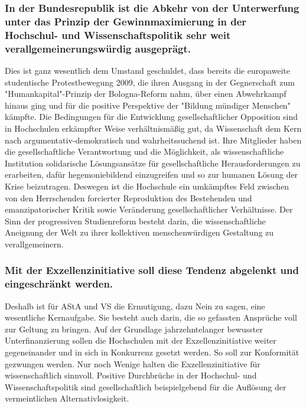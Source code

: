 \documentclass[ngerman,headheight=70pt]{scrartcl}
\begin{document}
    \subsubsection{In der Bundesrepublik ist die Abkehr von der Unterwerfung
    unter das Prinzip der Gewinnmaximierung in der Hochschul- und
    Wissenschaftspolitik sehr weit verallgemeinerungswürdig ausgeprägt.}

    Dies ist ganz wesentlich dem Umstand geschuldet, dass bereits die europaweite
    studentische Protestbewegung 2009, die ihren Ausgang in der Gegnerschaft zum
    "Humankapital"-Prinzip der Bologna-Reform nahm, über einen Abwehrkampf
    hinaus ging und für die positive Perspektive der "Bildung mündiger Menschen"
    kämpfte. Die Bedingungen für die Entwicklung gesellschaftlicher Opposition
    sind in Hochschulen erkämpfter Weise verhältnismäßig gut, da Wissenschaft dem
    Kern nach argumentativ-demokratisch und wahrheitssuchend ist. Ihre Mitglieder
    haben die gesellschaftliche Verantwortung und die Möglichkeit, als
    wissenschaftliche Institution solidarische Lösungsansätze für
    gesellschaftliche Herausforderungen zu erarbeiten, dafür hegemoniebildend
    einzugreifen und so zur humanen Lösung der Krise beizutragen. Deswegen ist
    die Hochschule ein umkämpftes Feld zwischen von den Herrschenden forcierter
    Reproduktion des Bestehenden und emanzipatorischer Kritik sowie Veränderung
    gesellschaftlicher Verhältnisse. Der Sinn der progressiven Studienreform
    besteht darin, die wissenschaftliche Aneignung der Welt zu ihrer kollektiven
    menschenwürdigen Gestaltung zu verallgemeinern.

    \subsubsection{Mit der Exzellenzinitiative soll diese Tendenz abgelenkt und
    eingeschränkt werden.}

    Deshalb ist für AStA und VS die Ermutigung, dazu Nein zu sagen, eine
    wesentliche Kernaufgabe. Sie besteht auch darin, die so gefassten Ansprüche
    voll zur Geltung zu bringen. Auf der Grundlage jahrzehntelanger bewusster
    Unterfinanzierung sollen die Hochschulen mit der Exzellenzinitiative weiter
    gegeneinander und in sich in Konkurrenz gesetzt werden. So soll zur
    Konformität gezwungen werden. Nur noch Wenige halten die Exzellenzinitiative
    für wissenschaftlich sinnvoll. Positive Durchbrüche in der Hochschul- und
    Wissenschaftspolitik sind gesellschaftlich beispielgebend für die Auflösung
    der vermeintlichen Alternativlosigkeit.
\end{document}
